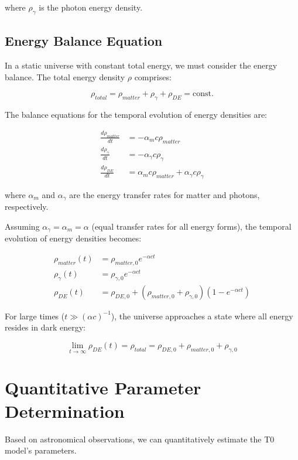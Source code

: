 \documentclass[a4paper,12pt]{article}
\theoremstyle{definition}
\theoremstyle{remark}
\begin{document}
	where $\rho_{\gamma}$ is the photon energy density.
	
	\subsection{Energy Balance Equation}
	In a static universe with constant total energy, we must consider the energy balance. The total energy density $\rho$ comprises:
	
	\begin{equation}
		\rho_{total} = \rho_{matter} + \rho_{\gamma} + \rho_{DE} = \text{const.}
	\end{equation}
	
	The balance equations for the temporal evolution of energy densities are:
	
	\begin{align}
		\frac{d\rho_{matter}}{dt} &= -\alpha_{m} c \rho_{matter} \\
		\frac{d\rho_{\gamma}}{dt} &= -\alpha_{\gamma} c \rho_{\gamma} \\
		\frac{d\rho_{DE}}{dt} &= \alpha_{m} c \rho_{matter} + \alpha_{\gamma} c \rho_{\gamma}
	\end{align}
	
	where $\alpha_{m}$ and $\alpha_{\gamma}$ are the energy transfer rates for matter and photons, respectively.
	
	Assuming $\alpha_{\gamma} = \alpha_{m} = \alpha$ (equal transfer rates for all energy forms), the temporal evolution of energy densities becomes:
	
	\begin{align}
		\rho_{matter}(t) &= \rho_{matter,0} e^{-\alpha c t} \\
		\rho_{\gamma}(t) &= \rho_{\gamma,0} e^{-\alpha c t} \\
		\rho_{DE}(t) &= \rho_{DE,0} + (\rho_{matter,0} + \rho_{\gamma,0})(1 - e^{-\alpha c t})
	\end{align}
	
	For large times ($t \gg (\alpha c)^{-1}$), the universe approaches a state where all energy resides in dark energy:
	
	\begin{equation}
		\lim_{t \rightarrow \infty} \rho_{DE}(t) = \rho_{total} = \rho_{DE,0} + \rho_{matter,0} + \rho_{\gamma,0}
	\end{equation}
	
	\section{Quantitative Parameter Determination}
	Based on astronomical observations, we can quantitatively estimate the T0 model’s parameters.
	
\end{document}
